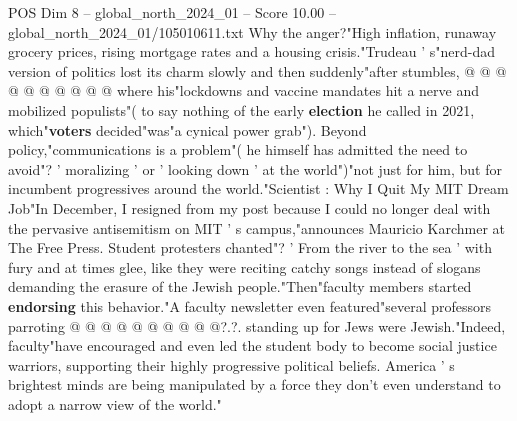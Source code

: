 \begin{textsample}{POS Dim 8 – global\_north\_2024\_01 – Score 10.00 – global\_north\_2024\_01/105010611.txt}
Why the anger?"High inflation, runaway grocery prices, rising mortgage rates and a housing crisis."Trudeau ' s"nerd-dad version of politics lost its charm slowly and then suddenly"after stumbles, @ @ @ @ @ @ @ @ @ @ where his"lockdowns and vaccine mandates hit a nerve and mobilized populists"( to say nothing of the early \textbf{election} he called in 2021, which"\textbf{voters} decided"was"a cynical power grab").
Beyond policy,"communications is a problem"( he himself has admitted the need to avoid"? ' moralizing ' or ' looking down ' at the world")"not just for him, but for incumbent progressives around the world."Scientist : Why I Quit My MIT Dream Job"In December, I resigned from my post because I could no longer deal with the pervasive antisemitism on MIT ' s campus,"announces Mauricio Karchmer at The Free Press.
Student protesters chanted"? ' From the river to the sea ' with fury and at times glee, like they were reciting catchy songs instead of slogans demanding the erasure of the Jewish people."Then"faculty members started \textbf{endorsing} this behavior."A faculty newsletter even featured"several professors parroting @ @ @ @ @ @ @ @ @ @?.?. standing up for Jews were Jewish."Indeed, faculty"have encouraged and even led the student body to become social justice warriors, supporting their highly progressive political beliefs.
America ' s brightest minds are being manipulated by a force they don't even understand to adopt a narrow view of the world."

\end{textsample}
